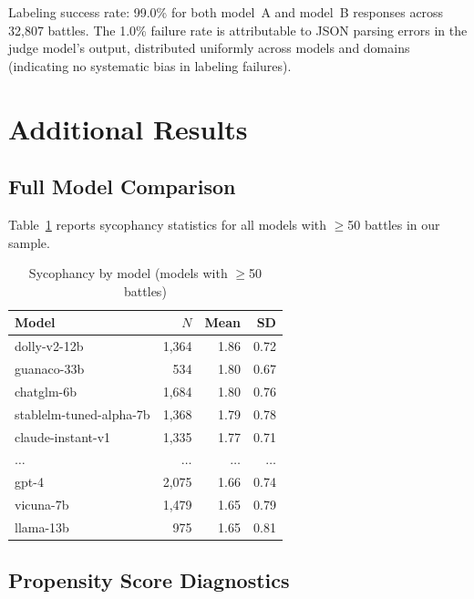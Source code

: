 \documentclass[11pt,twocolumn,a4paper]{article}
\begin{document}
Labeling success rate: 99.0\% for both model~A and model~B responses
across 32,807 battles. The 1.0\% failure rate is attributable to
JSON parsing errors in the judge model's output, distributed uniformly
across models and domains (indicating no systematic bias in labeling
failures).

\section{Additional Results}
\label{app:additional}

\subsection{Full Model Comparison}

Table~\ref{tab:models_full} reports sycophancy statistics for all
models with $\geq$50 battles in our sample.

\begin{table}[h]
  \centering
  \caption{Sycophancy by model (models with $\geq$50 battles)}
  \label{tab:models_full}
  \begin{tabular}{lrrr}
    \toprule
    Model & $N$ & Mean & SD \\
    \midrule
    dolly-v2-12b            & 1,364 & 1.86 & 0.72 \\
    guanaco-33b             &   534 & 1.80 & 0.67 \\
    chatglm-6b              & 1,684 & 1.80 & 0.76 \\
    stablelm-tuned-alpha-7b & 1,368 & 1.79 & 0.78 \\
    claude-instant-v1       & 1,335 & 1.77 & 0.71 \\
    $\ldots$                & $\ldots$ & $\ldots$ & $\ldots$ \\
    gpt-4                   & 2,075 & 1.66 & 0.74 \\
    vicuna-7b               & 1,479 & 1.65 & 0.79 \\
    llama-13b               &   975 & 1.65 & 0.81 \\
    \bottomrule
  \end{tabular}
\end{table}

\subsection{Propensity Score Diagnostics}
\end{document}
